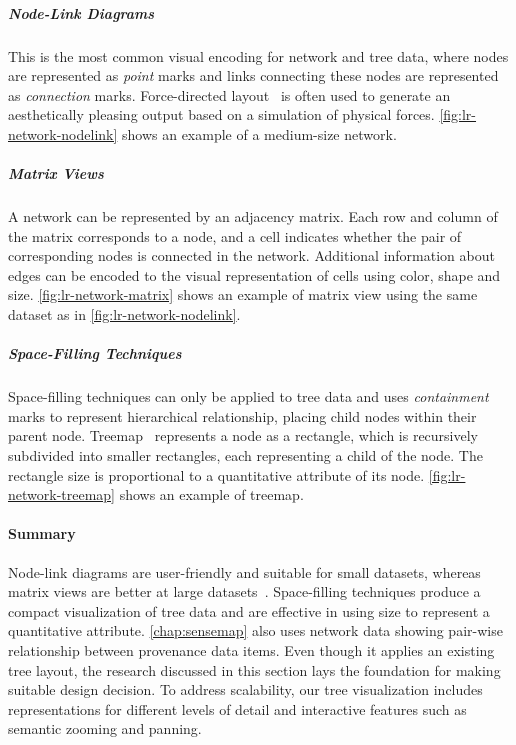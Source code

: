 \subparagraph{Node-Link Diagrams}
This is the most common visual encoding for network and tree data, where nodes are represented as \emph{point} marks and links connecting these nodes are represented as \emph{connection} marks. Force-directed layout~\cite{Eades1984} is often used to generate an aesthetically pleasing output based on a simulation of physical forces.  \autoref{fig:lr-network-nodelink} shows an example of a medium-size network.

\subparagraph{Matrix Views}
A network can be represented by an adjacency matrix. Each row and column of the matrix corresponds to a node, and a cell indicates whether the pair of corresponding nodes is connected in the network. Additional information about edges can be encoded to the visual representation of cells using color, shape and size. \autoref{fig:lr-network-matrix} shows an example of matrix view using the same dataset as in \autoref{fig:lr-network-nodelink}.

\subparagraph{Space-Filling Techniques}
Space-filling techniques can only be applied to tree data and uses \emph{containment} marks to represent hierarchical relationship, placing child nodes within their parent node. Treemap~\cite{Shneiderman1992} represents a node as a rectangle, which is recursively subdivided into smaller rectangles, each representing a child of the node. The rectangle size is proportional to a quantitative attribute of its node. \autoref{fig:lr-network-treemap} shows an example of treemap.

\paragraph{Summary}
Node-link diagrams are user-friendly and suitable for small datasets, whereas matrix views are better at large datasets~\cite{Ghoniem2005}. Space-filling techniques produce a compact visualization of tree data and are effective in using size to represent a quantitative attribute. \autoref{chap:sensemap} also uses network data showing pair-wise relationship between provenance data items. Even though it applies an existing tree layout, the research discussed in this section lays the foundation for making suitable design decision. To address scalability, our tree visualization includes representations for different levels of detail and interactive features such as semantic zooming and panning.